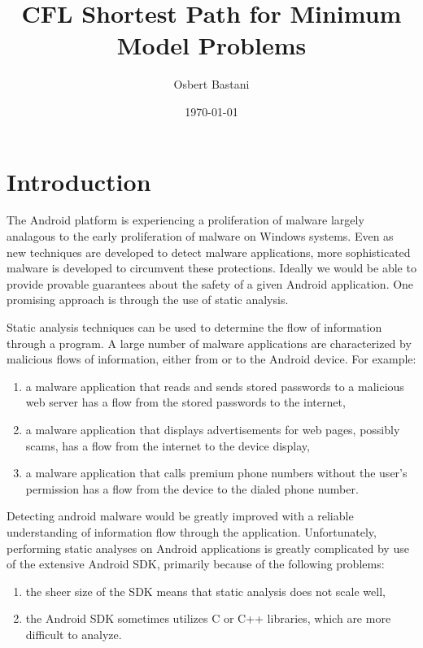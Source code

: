 \documentclass[10pt,twocolumn]{article}
\theoremstyle{definition}
\begin{document}
\title{CFL Shortest Path for Minimum Model Problems}
\author{Osbert Bastani}
\date{\today}
\maketitle

\section{Introduction}

\noindent The Android platform is experiencing a proliferation of malware largely analagous to the early proliferation of malware on Windows systems. Even as new techniques are developed to detect malware applications, more sophisticated malware is developed to circumvent these protections. Ideally we would be able to provide provable guarantees about the safety of a given Android application. One promising approach is through the use of static analysis.

Static analysis techniques can be used to determine the flow of information through a program. A large number of malware applications are characterized by malicious flows of information, either from or to the Android device. For example:
\begin{enumerate}
\item a malware application that reads and sends stored passwords to a malicious web server has a flow from the stored passwords to the internet,
\item a malware application that displays advertisements for web pages, possibly scams, has a flow from the internet to the device display,
\item a malware application that calls premium phone numbers without the user's permission has a flow from the device to the dialed phone number.
\end{enumerate}
Detecting android malware would be greatly improved with a reliable understanding of information flow through the application. Unfortunately, performing static analyses on Android applications is greatly complicated by use of the extensive Android SDK, primarily because of the following problems:
\begin{enumerate}
\item the sheer size of the SDK means that static analysis does not scale well,
\item the Android SDK sometimes utilizes C or C++ libraries, which are more difficult to analyze.
\end{enumerate}
\end{document}
